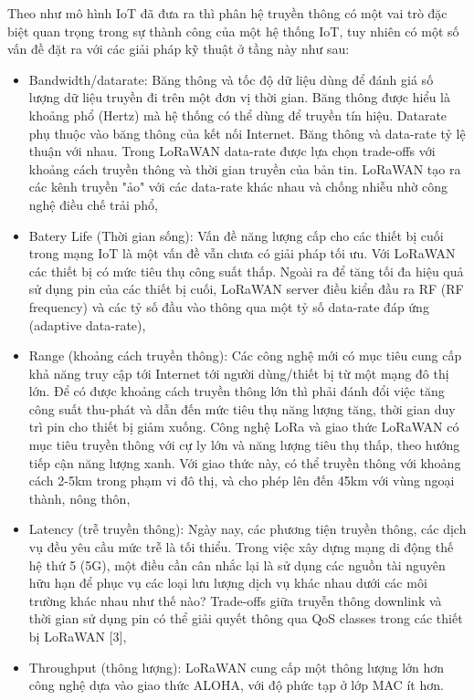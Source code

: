 Theo như mô hình IoT đã đưa ra thì phân hệ truyền thông có một vai trò đặc biệt quan trọng trong sự thành công của một hệ thống IoT, tuy nhiên có một số vấn đề đặt ra với các giải pháp kỹ thuật ở tầng này như sau:
\begin{itemize}
\item	Bandwidth/datarate: Băng thông và tốc độ dữ liệu dùng để đánh giá số lượng dữ liệu truyền đi trên một đơn vị thời gian. Băng thông được hiểu là khoảng phổ (Hertz) mà hệ thống có thể dùng để truyền tín hiệu. Datarate phụ thuộc vào băng thông của kết nối Internet. Băng thông và data-rate tỷ lệ thuận với nhau. Trong LoRaWAN data-rate được lựa chọn trade-offs với khoảng cách truyền thông và thời gian truyền của bản tin. LoRaWAN tạo ra các kênh truyền "ảo" với các data-rate khác nhau và chống nhiễu nhờ công nghệ điều chế trải phổ,
\item	Batery Life (Thời gian sống): Vấn đề năng lượng cấp cho các thiết bị cuối trong mạng IoT là một vấn đề vẫn chưa có giải pháp tối ưu. Với LoRaWAN các thiết bị có mức tiêu thụ công suất thấp. Ngoài ra để tăng tối đa hiệu quả sử dụng pin của các thiết bị cuối, LoRaWAN server điều kiển đầu ra RF (RF frequency) và các tỷ số đầu vào thông qua một tỷ số data-rate đáp ứng (adaptive data-rate),
\item	Range (khoảng cách truyền thông): Các công nghệ mới có mục tiêu cung cấp khả năng truy cập tới Internet tới người dùng/thiết bị từ một mạng đô thị lớn. Để có được khoảng cách truyền thông lớn thì phải đánh đổi việc tăng công suất thu-phát và dẫn đến mức tiêu thụ năng lượng tăng, thời gian duy trì pin cho thiết bị giảm xuống. Công nghệ LoRa và giao thức LoRaWAN có mục tiêu truyền thông với cự ly lớn và năng lượng tiêu thụ thấp, theo hướng tiếp cận năng lượng xanh. Với giao thức này, có thể truyền thông với khoảng cách 2-5km trong phạm vi đô thị, và cho phép lên đến 45km với vùng ngoại thành, nông thôn,
\item	Latency (trễ truyền thông): Ngày nay, các phương tiện truyền thông, các dịch vụ đều yêu cầu mức trễ là tối thiểu. Trong việc xây dựng mạng di động thế hệ thứ 5 (5G), một điều cần cân nhắc lại là sử dụng các nguồn tài nguyên hữu hạn để phục vụ các loại lưu lượng dịch vụ khác nhau dưới các môi trường khác nhau như thế nào? Trade-offs giữa truyễn thông downlink và thời gian sử dụng pin có thể giải quyết thông qua QoS classes trong các thiết bị LoRaWAN [3],
\item	Throughput (thông lượng): LoRaWAN cung cấp một thông lượng lớn hơn công nghệ dựa vào giao thức ALOHA, với độ phức tạp ở lớp MAC ít hơn.

\end{itemize}
